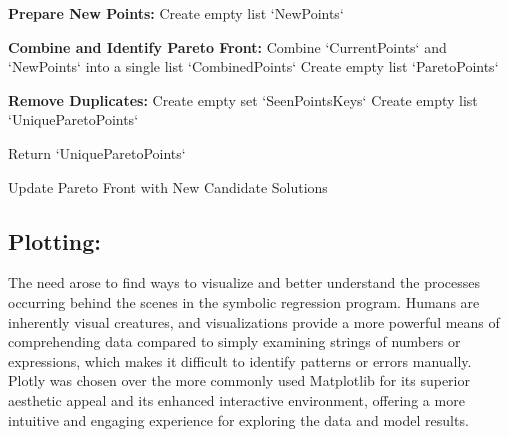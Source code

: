 \documentclass{article}
\begin{document}
\begin{algorithm}[H]
\SetAlgoLined %

\textbf{Prepare New Points:}\;
Create empty list `NewPoints`\;

\textbf{Combine and Identify Pareto Front:}\;
Combine `CurrentPoints` and `NewPoints` into a single list `CombinedPoints`\;
Create empty list `ParetoPoints`\;

\textbf{Remove Duplicates:}\;
Create empty set `SeenPointsKeys`\;
Create empty list `UniqueParetoPoints`\;

Return `UniqueParetoPoints`\;

\caption{Update Pareto Front with New Candidate Solutions}
\label{alg:update_pareto_points} %
\end{algorithm}



\subsection{Plotting: }


The need arose to find ways to visualize and better understand the processes occurring behind the scenes in the symbolic regression program. Humans are inherently visual creatures, and visualizations provide a more powerful means of comprehending data compared to simply examining strings of numbers or expressions, which makes it difficult to identify patterns or errors manually. Plotly was chosen over the more commonly used Matplotlib for its superior aesthetic appeal and its enhanced interactive environment, offering a more intuitive and engaging experience for exploring the data and model results.\\
\end{document}

